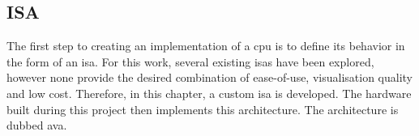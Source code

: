 \subsection{ISA} \label{sec:design_isa}

The first step to creating an implementation of a \ac{cpu} is to define its behavior in the form of an \ac{isa}. For this work, several existing \acp{isa} have been explored, however none provide the desired combination of ease-of-use, visualisation quality and low cost. Therefore, in this chapter, a custom \ac{isa} is developed. The hardware built during this project then implements this architecture. The architecture is dubbed \ac{ava}. 




